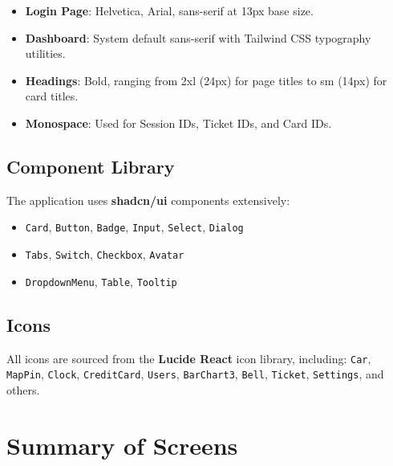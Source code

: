 \documentclass[12pt,a4paper]{article}
\begin{document}
\begin{itemize}
    \item \textbf{Login Page}: Helvetica, Arial, sans-serif at 13px base size.
    \item \textbf{Dashboard}: System default sans-serif with Tailwind CSS typography utilities.
    \item \textbf{Headings}: Bold, ranging from 2xl (24px) for page titles to sm (14px) for card titles.
    \item \textbf{Monospace}: Used for Session IDs, Ticket IDs, and Card IDs.
\end{itemize}

\subsection{Component Library}

The application uses \textbf{shadcn/ui} components extensively:
\begin{itemize}
    \item \texttt{Card}, \texttt{Button}, \texttt{Badge}, \texttt{Input}, \texttt{Select}, \texttt{Dialog}
    \item \texttt{Tabs}, \texttt{Switch}, \texttt{Checkbox}, \texttt{Avatar}
    \item \texttt{DropdownMenu}, \texttt{Table}, \texttt{Tooltip}
\end{itemize}

\subsection{Icons}

All icons are sourced from the \textbf{Lucide React} icon library, including: \texttt{Car}, \texttt{MapPin}, \texttt{Clock}, \texttt{CreditCard}, \texttt{Users}, \texttt{BarChart3}, \texttt{Bell}, \texttt{Ticket}, \texttt{Settings}, and others.

\section{Summary of Screens}
\label{sec:summary}
\end{document}

